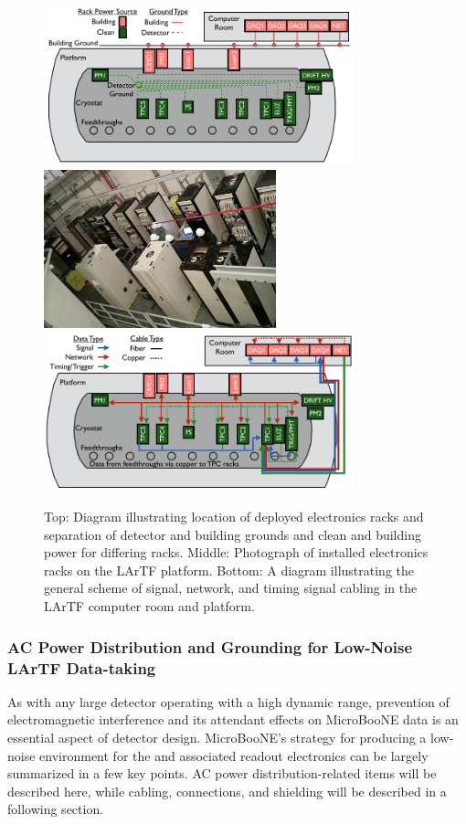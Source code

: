 \begin{figure}
\centering
\includegraphics[width=0.8\textwidth]{./figures/ACDist.png}
\includegraphics[width=0.6\textwidth]{./figures/ActualRacks.png}
\includegraphics[width=0.8\textwidth]{./figures/DataDist.png}
\caption[]{Top: Diagram illustrating location of deployed electronics racks and separation of detector and building grounds and clean and building power for differing racks.  Middle: Photograph of installed electronics racks on the LArTF platform.  Bottom: A diagram illustrating the general scheme of signal, network, and timing signal cabling in the LArTF computer room and platform.}
\label{fig:ElecInfDiagrams}
\end{figure}

\subsubsection{AC Power Distribution and Grounding for Low-Noise LArTF Data-taking}
As with any large detector operating with a high dynamic range, prevention of electromagnetic interference and its attendant effects on MicroBooNE data is an essential aspect of detector design.  MicroBooNE's strategy for producing a low-noise environment for the \lartpc and associated readout electronics can be largely summarized in a few key points.  AC power distribution-related items will be described here, while cabling, connections, and shielding will be described in a following section.

